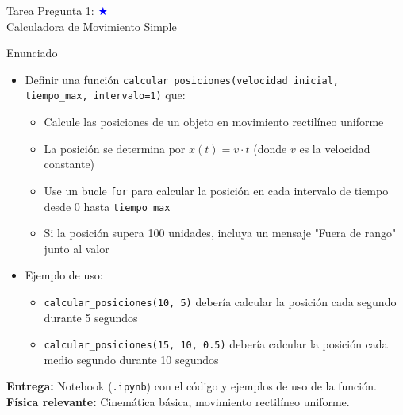 \documentclass[10pt]{beamer}
\begin{document}
\begin{frame}{Tarea Pregunta 1: \hfill \textcolor{blue}{$\bigstar$} \\ Calculadora de Movimiento Simple}
  \begin{block}{Enunciado}
    \begin{itemize}
      \item Definir una función \texttt{calcular\_posiciones(velocidad\_inicial, tiempo\_max, intervalo=1)} que:
        \begin{itemize}
          \item Calcule las posiciones de un objeto en movimiento rectilíneo uniforme
          \item La posición se determina por $x(t) = v \cdot t$ (donde $v$ es la velocidad constante)
          \item Use un bucle \texttt{for} para calcular la posición en cada intervalo de tiempo desde 0 hasta \texttt{tiempo\_max}
          \item Si la posición supera 100 unidades, incluya un mensaje "Fuera de rango" junto al valor
        \end{itemize}
      \item Ejemplo de uso:
        \begin{itemize}
          \item \texttt{calcular\_posiciones(10, 5)} debería calcular la posición cada segundo durante 5 segundos
          \item \texttt{calcular\_posiciones(15, 10, 0.5)} debería calcular la posición cada medio segundo durante 10 segundos
        \end{itemize}
    \end{itemize}
  \end{block}
  
  \textbf{Entrega:} Notebook (\texttt{.ipynb}) con el código y ejemplos de uso de la función.\\
  \textbf{Física relevante:} Cinemática básica, movimiento rectilíneo uniforme.
\end{frame}
\end{document}
